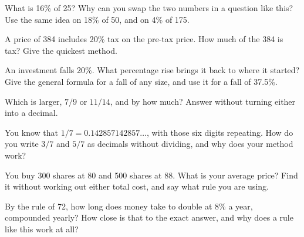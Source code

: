 \begin{question}\label{iq:iv1:mental-technique:6}
What is 16\% of 25? Why can you swap the two numbers in a question like this? Use the same idea on 18\% of 50, and on 4\% of 175.
\end{question}

\begin{question}\label{iq:iv1:mental-technique:7}
A price of 384 includes 20\% tax on the pre-tax price. How much of the 384 is tax? Give the quickest method.
\end{question}

\begin{question}\label{iq:iv1:mental-technique:8}
An investment falls 20\%. What percentage rise brings it back to where it started? Give the general formula for a fall of any size, and use it for a fall of 37.5\%.
\end{question}

\begin{question}\label{iq:iv1:mental-technique:9}
Which is larger, $7/9$ or $11/14$, and by how much? Answer without turning either into a decimal.
\end{question}

\begin{question}\label{iq:iv1:mental-technique:10}
You know that $1/7 = 0.142857142857\dots$, with those six digits repeating. How do you write $3/7$ and $5/7$ as decimals without dividing, and why does your method work?
\end{question}

\begin{question}\label{iq:iv1:mental-technique:11}
You buy 300 shares at 80 and 500 shares at 88. What is your average price? Find it without working out either total cost, and say what rule you are using.
\end{question}

\begin{question}\label{iq:iv1:mental-technique:12}
By the rule of 72, how long does money take to double at 8\% a year, compounded yearly? How close is that to the exact answer, and why does a rule like this work at all?
\end{question}

